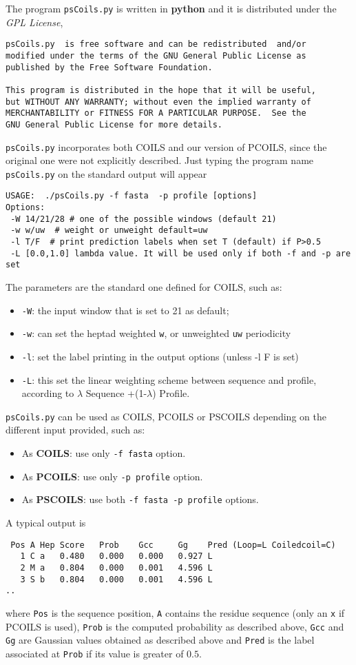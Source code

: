 \documentclass[11pt,english]{article}
\begin{document}
The program {\tt psCoils.py} is written in {\bf python} and it is distributed under the
{\em GPL License}, 
\begin{verbatim}
psCoils.py  is free software and can be redistributed  and/or 
modified under the terms of the GNU General Public License as 
published by the Free Software Foundation.

This program is distributed in the hope that it will be useful,
but WITHOUT ANY WARRANTY; without even the implied warranty of
MERCHANTABILITY or FITNESS FOR A PARTICULAR PURPOSE.  See the
GNU General Public License for more details.

\end{verbatim}
{\tt psCoils.py} incorporates both COILS and our version of PCOILS, since the original one 
\cite{pcoils} were not explicitly described. 
Just typing the program name {\tt psCoils.py} on the standard output will appear
\begin{verbatim}
USAGE:  ./psCoils.py -f fasta  -p profile [options]
Options:
 -W 14/21/28 # one of the possible windows (default 21)
 -w w/uw  # weight or unweight default=uw
 -l T/F  # print prediction labels when set T (default) if P>0.5
 -L [0.0,1.0] lambda value. It will be used only if both -f and -p are set
\end{verbatim}
The parameters are the standard one defined for COILS, such as: 
\begin{itemize}
\item {\tt -W}: the input window that is set to 21 as default;
\item {\tt -w}: can set the heptad weighted {\tt w}, or unweighted {\tt uw} periodicity
\item {\tt -l}: set the label printing in the output options (unless -l F is set)
\item {\tt -L}: this set the linear weighting scheme between sequence and profile, according to
                $\lambda$ Sequence +(1-$\lambda$) Profile.
\end{itemize}
{\tt psCoils.py} can be used as COILS, PCOILS or PSCOILS depending on the different
input provided, such as:
\begin{itemize}
\item As {\bf COILS}: use only {\tt -f fasta} option.
\item As {\bf PCOILS}: use only {\tt -p profile} option.  
\item As {\bf PSCOILS}: use both {\tt -f fasta -p profile} options.  
\end{itemize}
A typical output is 
\begin{verbatim}
 Pos A Hep Score   Prob    Gcc     Gg    Pred (Loop=L Coiledcoil=C)
   1 C a   0.480   0.000   0.000   0.927 L
   2 M a   0.804   0.000   0.001   4.596 L
   3 S b   0.804   0.000   0.001   4.596 L
..
\end{verbatim}
where {\tt Pos} is the sequence position, {\tt A} contains the residue sequence
(only an {\tt x} if PCOILS is used), {\tt Prob} is the computed probability as
described above, {\tt Gcc} and {\tt Gg} are Gaussian values obtained as described above
and {\tt Pred} is the label associated at {\tt Prob} if its value is greater of $0.5$. 
\end{document}
